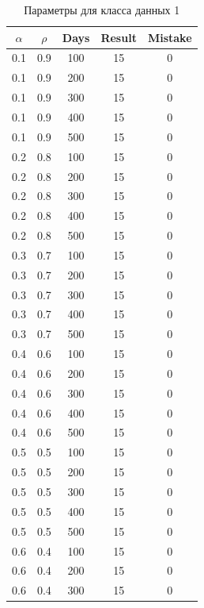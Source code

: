\begin{center}
    \captionsetup{justification=raggedright,singlelinecheck=off}
    \begin{longtable}[c]{|c|c|c|c|c|}
    \caption{Параметры для класса данных 1\label{tbl:table_kd1}}\\ \hline
        $\alpha$ & $\rho$ & Days & Result & Mistake \\ \hline
 0.1 &  0.9 &  100 &    15 &     0 \\
 0.1 &  0.9 &  200 &    15 &     0 \\
 0.1 &  0.9 &  300 &    15 &     0 \\
 0.1 &  0.9 &  400 &    15 &     0 \\
 0.1 &  0.9 &  500 &    15 &     0 \\
\hline
 0.2 &  0.8 &  100 &    15 &     0 \\
 0.2 &  0.8 &  200 &    15 &     0 \\
 0.2 &  0.8 &  300 &    15 &     0 \\
 0.2 &  0.8 &  400 &    15 &     0 \\
 0.2 &  0.8 &  500 &    15 &     0 \\
\hline
 0.3 &  0.7 &  100 &    15 &     0 \\
 0.3 &  0.7 &  200 &    15 &     0 \\
 0.3 &  0.7 &  300 &    15 &     0 \\
 0.3 &  0.7 &  400 &    15 &     0 \\
 0.3 &  0.7 &  500 &    15 &     0 \\
\hline
 0.4 &  0.6 &  100 &    15 &     0 \\
 0.4 &  0.6 &  200 &    15 &     0 \\
 0.4 &  0.6 &  300 &    15 &     0 \\
 0.4 &  0.6 &  400 &    15 &     0 \\
 0.4 &  0.6 &  500 &    15 &     0 \\
\hline
 0.5 &  0.5 &  100 &    15 &     0 \\
 0.5 &  0.5 &  200 &    15 &     0 \\
 0.5 &  0.5 &  300 &    15 &     0 \\
 0.5 &  0.5 &  400 &    15 &     0 \\
 0.5 &  0.5 &  500 &    15 &     0 \\
\hline
 0.6 &  0.4 &  100 &    15 &     0 \\
 0.6 &  0.4 &  200 &    15 &     0 \\
 0.6 &  0.4 &  300 &    15 &     0 \\

\end{longtable}
\end{center}
